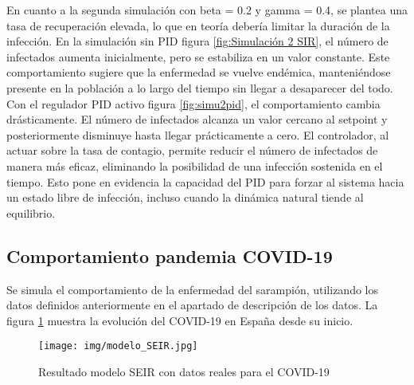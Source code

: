 En cuanto a la segunda simulación con beta = 0.2 y gamma = 0.4, se plantea una tasa de recuperación elevada, lo que en teoría debería limitar la duración de la infección. En la simulación sin PID figura \ref{fig:Simulación 2 SIR}, el número de infectados aumenta inicialmente, pero se estabiliza en un valor constante. Este comportamiento sugiere que la enfermedad se vuelve endémica, manteniéndose presente en la población a lo largo del tiempo sin llegar a desaparecer del todo. Con el regulador PID activo figura \ref{fig:simu2pid}, el comportamiento cambia drásticamente. El número de infectados alcanza un valor cercano al setpoint y posteriormente disminuye hasta llegar prácticamente a cero. El controlador, al actuar sobre la tasa de contagio, permite reducir el número de infectados de manera más eficaz, eliminando la posibilidad de una infección sostenida en el tiempo. Esto pone en evidencia la capacidad del PID para forzar al sistema hacia un estado libre de infección, incluso cuando la dinámica natural tiende al equilibrio.



\subsection{Comportamiento pandemia COVID-19}
Se simula el comportamiento de la enfermedad del sarampión, utilizando los datos definidos anteriormente en el apartado de descripción de los datos. La figura \ref{fig:Simucov} muestra la evolución del COVID-19 en España desde su inicio.

\begin{figure}[H]
    \centering
    \texttt{[image: img/modelo\_SEIR.jpg]}
    \caption{Resultado modelo SEIR con datos reales para el COVID-19}
    \label{fig:Simucov}
    \vspace{0.5cm} %
\end{figure}

